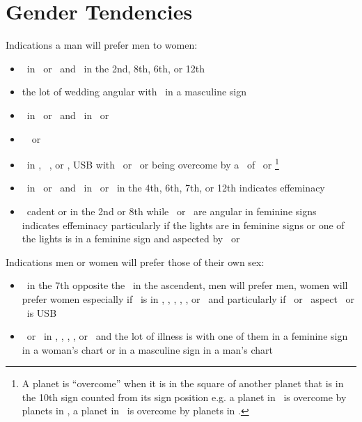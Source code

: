 \section{Gender Tendencies}

Indications a man will prefer men to women:
\begin{itemize}[topsep=0em,itemsep=0em]
\item \Venus\, in \Gemini\, or \Virgo\, and \Mercury\, in the 2nd, 8th, 6th, or 12th
\item the lot of wedding angular with \Mercury\, in a masculine sign
\item \Mars\, in \Gemini\, or \Virgo\, and \Mercury\, in \Aries\, or \Scorpio
\item \Mars\, \Square\, or \Opposition\, \Mercury

\item \Venus\,  in \Aries, \Taurus\, \Capricorn, or \Pisces, USB with \Saturn\, or \Mars\, or being overcome by a \Square\, of \Saturn\, or \Mars\footnote{A planet is ``overcome'' when it is in the square of another planet that is  in the 10th sign counted from its sign position e.g. a planet in \Aries\, is overcome by planets in \Capricorn, a planet in \Libra\, is overcome by planets in \Cancer.}

\item \Venus\, in \Capricorn\, or \Aquarius\, and \Saturn\, in \Taurus\, or \Libra\, in the 4th, 6th, 7th, or 12th indicates effeminacy

\item \Venus\, cadent or in the 2nd or 8th while \Saturn\, or \Mars\, are angular in feminine signs indicates effeminacy particularly if the lights are in feminine signs or one of the lights is in a feminine sign and aspected by \Saturn\, or \Mars
\end{itemize}

Indications men or women will prefer those of their own sex:
\begin{itemize}[topsep=0em,itemsep=0em]
\item \Venus\, in the 7th opposite the \Moon\, in the ascendent, men will prefer men, women will prefer women especially if \Venus\, is in \Leo, \Virgo, \Aries, \Scorpio, \Capricorn, or \Aquarius\, and particularly if \Saturn\, or \Mars\, aspect \Venus\ or \Venus\, is USB

\item \Saturn\, or \Mars\, in \Aries, \Taurus, \Capricorn, \Aquarius, or \Pisces\, and the lot of illness is with one of them in a feminine sign in a woman's chart or in a masculine sign in a man's chart
\end{itemize}

